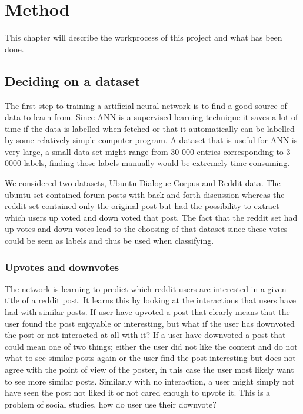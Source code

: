\chapter{Method}%
This chapter will describe the workprocess of this project and what has been done.
\section{Deciding on a dataset}
The first step to training a artificial neural network is to find a good source of data to learn from. Since ANN is a supervised learning technique it saves a lot of time if the data is labelled when fetched or that it automatically can be labelled by some relatively simple computer program. A dataset that is useful for ANN is very large, a small data set might range from 30 000 entries corresponding to 3 0000 labels, finding those labels manually would be extremely time consuming.

We considered two datasets, Ubuntu Dialogue Corpus and Reddit data. The ubuntu set contained forum posts with back and forth discussion whereas the reddit set contained only the original post but had the possibility to extract which users up voted and down voted that post. The fact that the reddit set had up-votes and down-votes lead to the choosing of that dataset since these votes could be seen as labels and thus be used when classifying. 

\subsection{Upvotes and downvotes}
The network is learning to predict which reddit users are interested in a given title of a reddit post. It learns this by looking at the interactions that users have had with similar posts. If user have upvoted a post that clearly means that the user found the post enjoyable or interesting, but what if the user has downvoted the post or not interacted at all with it? %
If a user have downvoted a post that could mean one of two things; either the user did not like the content and do not what to see similar posts again or the user find the post interesting but does not agree with the point of view of the poster, in this case the user most likely want to see more similar posts. Similarly with no interaction, a user might simply not have seen the post not liked it or not cared enough to upvote it. This is a problem of social studies, how do user use their downvote?

